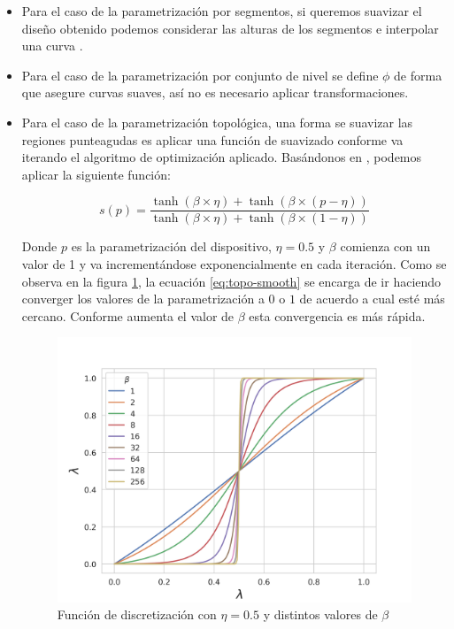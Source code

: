 \begin{itemize}
  \item Para el caso de la parametrización por segmentos, si queremos suavizar el diseño obtenido podemos considerar las alturas de los segmentos e interpolar una curva \citep{Yangjin2013}.

  \item Para el caso de la parametrización por conjunto de nivel se define $\phi$ de forma que asegure curvas suaves, así no es necesario aplicar transformaciones.

  \item Para el caso de la parametrización topológica, una forma se suavizar las regiones punteagudas es aplicar una función de suavizado conforme va iterando el algoritmo de optimización aplicado. Basándonos en \cite{Zhang2021}, podemos aplicar la siguiente función:

\begin{equation}
  s(p) = \frac{\tanh (\beta \times \eta) + \tanh (\beta \times (p - \eta))}{\tanh (\beta \times \eta) + \tanh (\beta \times (1 - \eta))}
  \label{eq:topo-smooth}
\end{equation}

    Donde $p$ es la parametrización del dispositivo, $\eta = 0.5$ y $\beta$ comienza con un valor de 1 y va incrementándose exponencialmente en cada iteración. 
    Como se observa en la figura \ref{fig:discretization}, la ecuación \ref{eq:topo-smooth} se encarga de ir haciendo converger los valores de la parametrización a $0$ o $1$ de acuerdo a cual esté más cercano. 
    Conforme aumenta el valor de $\beta$ esta convergencia es más rápida.

    \begin{figure}[ht]
      \centering
      \includegraphics[scale=0.8]{image/theory/discretization.png}
      \caption{Función de discretización con $\eta = 0.5$ y distintos valores de $\beta$}
      \label{fig:discretization}
    \end{figure}

\end{itemize}


